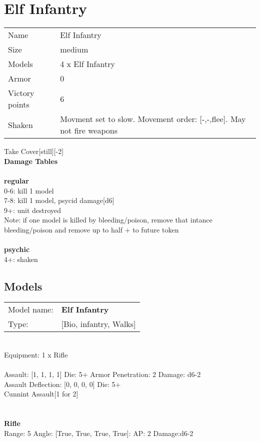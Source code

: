 \pagebreak

\section{ Elf Infantry }

\begin{tabular}{ll}
  Name & Elf Infantry \\
  Size & medium\\
  Models & 4 x Elf Infantry\\
  Armor & 0\\
  Victory points & 6\\
  Shaken & Movment set to slow. Movement order: [-,-,flee]. May not fire weapons\\
\end{tabular}

Take Cover[still][-2]\\ 



{\bf Damage Tables} \\
\ \\ {\bf regular } \\
0-6: kill 1 model \\
7-8: kill 1 model, psycid damage[d6] \\
9+: unit destroyed \\
Note: if one model is killed by bleeding/poison, remove that intance \\ bleeding/poison and remove up to half + to future token \\
\ \\ {\bf psychic } \\
4+: shaken \\


\pagebreak

\subsection{ Models }

\begin{tabular}{ll}
Model name: & {\bf Elf Infantry } \\
Type: & [Bio, infantry, Walks] \\
\end{tabular}
\ \\
Equipment: 1 x Rifle \\
\ \\
Assault: [1, 1, 1, 1] Die: 5+ Armor Penetration: 2 Damage: d6-2 \\
Assault Deflection: [0, 0, 0, 0] Die: 5+\\
\indent Cunnint Assault[1 for 2]\\ 
 
\ \\

\ \\
{\bf Rifle } \\



Range: 5  Angle: [True, True, True, True]: AP: 2 Damage:d6-2 \\




 
\ \\














